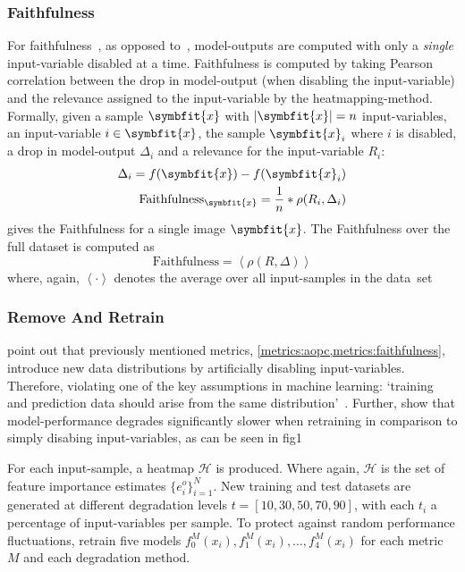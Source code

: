 \subsubsection{Faithfulness}\label{metrics:faithfulness}
For faithfulness~\cite{AlvarezMelis.2018, Tomsett.2019}, as opposed to~, model-outputs are computed with only a \textit{single} input-variable disabled at a time. Faithfulness is computed by taking Pearson correlation between the drop in model-output (when disabling the input-variable) and the relevance assigned to the input-variable by the heatmapping-method. Formally, given a sample \(\symbfit{x}\) with \(\left|\symbfit{x}\right|=n\) input-variables, an input-variable \(i\in \symbfit{x}\), the sample \(\symbfit{x}_i\) where \(i\) is disabled, a drop in model-output \(\Delta_i\) and a relevance for the input-variable \(R_i\):
\begin{align*}
    \Delta_i = f(\symbfit{x}) - f(\symbfit{x}_i)\\
    \text{Faithfulness}_{\symbfit{x}} = \frac{1}{n}*\rho(R_i, \Delta_i)
\end{align*}
gives the Faithfulness for a single image \(\symbfit{x}\). The Faithfulness over the full dataset is computed as
\[
    \text{Faithfulness} = \left<\rho(R, \Delta)\right>
\]
where, again, \(\left< \cdot \right>\) denotes the average over all input-samples in the \mbox{data set}


\subsubsection{Remove And Retrain}\label{metrics:roar}
\citeauthor{Hooker.2019} point out that previously mentioned metrics, \cref{metrics:aopc,metrics:faithfulness}, introduce new data distributions by artificially disabling input-variables. Therefore, violating one of the key assumptions in machine learning: `training and prediction data should arise from the same distribution'~\cite{McGaughey.2016}. Further, \citeauthor{Hooker.2019} show that model-performance degrades significantly slower when retraining in comparison to simply disabing input-variables, as can be seen in fig1
\par
For each input-sample, a heatmap \(\mathscr H\) is produced. Where again,
\(\mathscr H\) is the set of feature importance estimates \( \{ e^{o}_{i} \}^N_{i=1} \). New training and test datasets are generated at different degradation levels \(t=\left[10, 30, 50, 70, 90 \right]\), with each \(t_i\) a percentage of input-variables per sample. To protect against random performance fluctuations, \citeauthor{Hooker.2019} retrain five models \(f_0^M(x_i), f_1^M(x_i),\ldots, f_4^M(x_i)\) for each metric \(M\) and each degradation method.

